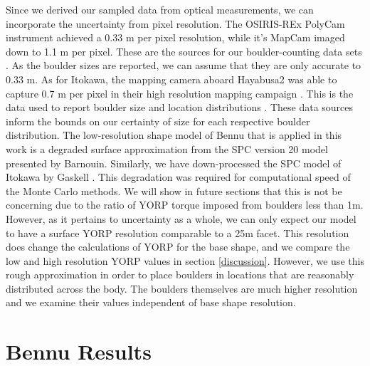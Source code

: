 Since we derived our sampled data from optical measurements, we can incorporate the uncertainty from pixel resolution. The OSIRIS-REx PolyCam instrument achieved a 0.33 m per pixel resolution, while it's MapCam imaged down to 1.1 m per pixel. These are the sources for our boulder-counting data sets \citep{DellaGiustina2019}. As the boulder sizes are reported, we can assume that they are only accurate to 0.33 m. As for Itokawa, the mapping camera aboard Hayabusa2 was able to capture 0.7 m per pixel in their high resolution mapping campaign \citep{Saito2006}. This is the data used to report boulder size and location distributions \citep{Michikami2008}. These data sources inform the bounds on our certainty of size for each respective boulder distribution.
The low-resolution shape model of Bennu that is applied in this work is a degraded surface approximation from the SPC version 20 model presented by Barnouin. Similarly, we have down-processed the SPC model of Itokawa by Gaskell \citep{Gaskell2006}. This degradation was required for computational speed of the Monte Carlo methods.
We will show in future sections that this is not be concerning due to the ratio of YORP torque imposed from boulders less than 1m. However, as it pertains to uncertainty as a whole, we can only expect our model to have a surface YORP resolution comparable to a 25m facet. This resolution does change the calculations of YORP for the base shape, and we compare the low and high resolution YORP values in section \ref{discussion}. However, we use this rough approximation in order to place boulders in locations that are reasonably distributed across the body. The boulders themselves are much higher resolution and we examine their values independent of base shape resolution.



\section{Bennu Results}\label{bennu}

